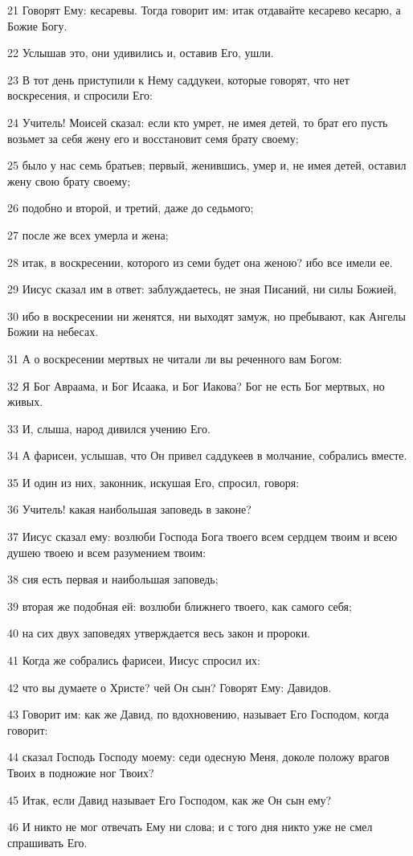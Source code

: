 \par 21 Говорят Ему: кесаревы. Тогда говорит им: итак отдавайте кесарево кесарю, а Божие Богу.
\par 22 Услышав это, они удивились и, оставив Его, ушли.
\par 23 В тот день приступили к Нему саддукеи, которые говорят, что нет воскресения, и спросили Его:
\par 24 Учитель! Моисей сказал: если кто умрет, не имея детей, то брат его пусть возьмет за себя жену его и восстановит семя брату своему;
\par 25 было у нас семь братьев; первый, женившись, умер и, не имея детей, оставил жену свою брату своему;
\par 26 подобно и второй, и третий, даже до седьмого;
\par 27 после же всех умерла и жена;
\par 28 итак, в воскресении, которого из семи будет она женою? ибо все имели ее.
\par 29 Иисус сказал им в ответ: заблуждаетесь, не зная Писаний, ни силы Божией,
\par 30 ибо в воскресении ни женятся, ни выходят замуж, но пребывают, как Ангелы Божии на небесах.
\par 31 А о воскресении мертвых не читали ли вы реченного вам Богом:
\par 32 Я Бог Авраама, и Бог Исаака, и Бог Иакова? Бог не есть Бог мертвых, но живых.
\par 33 И, слыша, народ дивился учению Его.
\par 34 А фарисеи, услышав, что Он привел саддукеев в молчание, собрались вместе.
\par 35 И один из них, законник, искушая Его, спросил, говоря:
\par 36 Учитель! какая наибольшая заповедь в законе?
\par 37 Иисус сказал ему: возлюби Господа Бога твоего всем сердцем твоим и всею душею твоею и всем разумением твоим:
\par 38 сия есть первая и наибольшая заповедь;
\par 39 вторая же подобная ей: возлюби ближнего твоего, как самого себя;
\par 40 на сих двух заповедях утверждается весь закон и пророки.
\par 41 Когда же собрались фарисеи, Иисус спросил их:
\par 42 что вы думаете о Христе? чей Он сын? Говорят Ему: Давидов.
\par 43 Говорит им: как же Давид, по вдохновению, называет Его Господом, когда говорит:
\par 44 сказал Господь Господу моему: седи одесную Меня, доколе положу врагов Твоих в подножие ног Твоих?
\par 45 Итак, если Давид называет Его Господом, как же Он сын ему?
\par 46 И никто не мог отвечать Ему ни слова; и с того дня никто уже не смел спрашивать Его.

